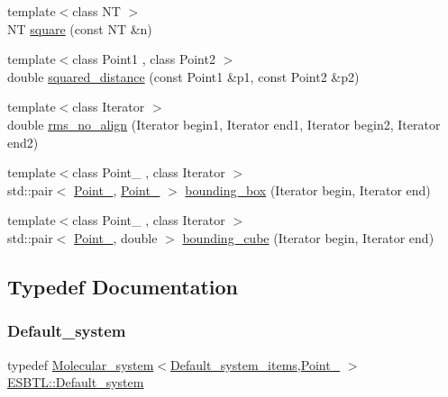 \begin{DoxyCompactItemize}
{\footnotesize template$<$class NT $>$ }\\NT \hyperlink{namespaceESBTL_a299d5228412abc3193662250966ffcc8}{square} (const NT \&n)
\item 
{\footnotesize template$<$class Point1 , class Point2 $>$ }\\double \hyperlink{namespaceESBTL_a69e57b4bdcbcbbd6e93d4c75f5629174}{squared\+\_\+distance} (const Point1 \&p1, const Point2 \&p2)
\item 
{\footnotesize template$<$class Iterator $>$ }\\double \hyperlink{namespaceESBTL_a6f47ecb6c6f49a71b6e621f2d6067b0d}{rms\+\_\+no\+\_\+align} (Iterator begin1, Iterator end1, Iterator begin2, Iterator end2)
\item 
{\footnotesize template$<$class Point\+\_ , class Iterator $>$ }\\std\+::pair$<$ \hyperlink{classESBTL_1_1Point__3}{Point\+\_}, \hyperlink{classESBTL_1_1Point__3}{Point\+\_} $>$ \hyperlink{namespaceESBTL_ab90e1391147ae51849cfeaf3746c9e28}{bounding\+\_\+box} (Iterator begin, Iterator end)
\item 
{\footnotesize template$<$class Point\+\_ , class Iterator $>$ }\\std\+::pair$<$ \hyperlink{classESBTL_1_1Point__3}{Point\+\_}, double $>$ \hyperlink{namespaceESBTL_a2ced09786c7300de161c1b7b3b6c3784}{bounding\+\_\+cube} (Iterator begin, Iterator end)
\end{DoxyCompactItemize}


\subsection{Typedef Documentation}
\mbox{\label{namespaceESBTL_a80ccb2de0f963d73a45f0bce33397cd2}} 
\subsubsection{\texorpdfstring{Default\+\_\+system}{Default\_system}}
{\footnotesize\ttfamily typedef \hyperlink{classESBTL_1_1Molecular__system}{Molecular\+\_\+system}$<$\hyperlink{structESBTL_1_1Default__system__items}{Default\+\_\+system\+\_\+items},\hyperlink{classESBTL_1_1Point__3}{Point\+\_} $>$ \hyperlink{namespaceESBTL_a80ccb2de0f963d73a45f0bce33397cd2}{E\+S\+B\+T\+L\+::\+Default\+\_\+system}}

